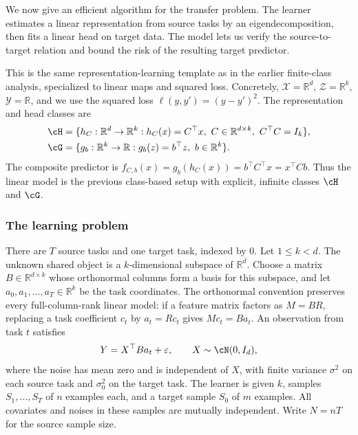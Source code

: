 \documentclass[11pt,twoside]{article}
\newcommand{\R}{\mathbb R}
\theoremstyle{definition}
\theoremstyle{remark}
\begin{document}
We now give an efficient algorithm for the transfer problem. The learner
estimates a linear representation from source tasks by an eigendecomposition,
then fits a linear head on target data. The model lets us verify the
source-to-target relation and bound the risk of the resulting target
predictor.

This is the same representation-learning template as in the earlier finite-class
analysis, specialized to linear maps and squared loss. Concretely,
$\mathcal X=\mathbb R^d$, $\mathcal Z=\mathbb R^k$, $\mathcal Y=\mathbb R$, and
we use the squared loss $\ell(y,y')=(y-y')^2$. The representation and head
classes are
\begin{align}
 \cH
 &=\{h_C:\R^d\to\R^k:
       h_C(x)=C^\top x,\ C\in\R^{d\times k},\ C^\top C=I_k\},
 \label{eq:linear-representation-class}\\
 \cG
 &=\{g_b:\R^k\to\R:
       g_b(z)=b^\top z,\ b\in\R^k\}.
 \label{eq:linear-head-class}
\end{align}
The composite predictor is
$f_{C,b}(x)=g_b(h_C(x))=b^\top C^\top x=x^\top Cb$.
Thus the linear model is the previous class-based setup with explicit,
infinite classes $\cH$ and $\cG$.

\subsubsection{The learning problem}

There are $T$ source tasks and one target task, indexed by $0$.
Let $1\le k<d$. The unknown shared object is a $k$-dimensional subspace of
$\R^d$. Choose a matrix $B\in\R^{d\times k}$ whose orthonormal columns form
a basis for this subspace, and let $a_0,a_1,\ldots,a_T\in\R^k$ be the task
coordinates. The orthonormal convention preserves every full-column-rank
linear model: if a feature matrix factors as $M=BR$, replacing a task
coefficient $c_t$ by $a_t=Rc_t$ gives $Mc_t=Ba_t$. An observation from
task $t$ satisfies
\begin{equation}
 Y=X^\top Ba_t+\varepsilon,
 \qquad X\sim\cN(0,I_d),
 \label{eq:source-model}
\end{equation}
where the noise has mean zero and is independent of $X$, with finite
variance $\sigma^2$ on each source task and $\sigma_0^2$ on the target task.
The learner is given $k$, samples $S_1,\ldots,S_T$ of $n$ examples each,
and a target sample $S_0$ of $m$ examples. All covariates and noises in these
samples are mutually independent. Write $N=nT$ for the source sample size.
\end{document}
